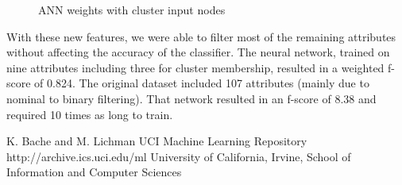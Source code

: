 \documentclass{sig-alternate}
\begin{document}
\begin{figure}[!htbp]
    \centering
    \theverbbox
    \caption{ANN weights with cluster input nodes\label{ann-cluster-weights}}
\end{figure}

With these new features, we were able to filter most of the remaining attributes without affecting the accuracy of the classifier. The neural network, trained on nine attributes including three for cluster membership, resulted in a weighted f-score of 0.824. The original dataset included 107 attributes (mainly due to nominal to binary filtering). That network resulted in an f-score of 8.38 and required 10 times as long to train.








\begin{thebibliography}{10}

K. Bache and M. Lichman
\newblock UCI Machine Learning Repository
\newblock http://archive.ics.uci.edu/ml
\newblock University of California, Irvine, School of Information and Computer Sciences


\end{thebibliography}
\end{document}
